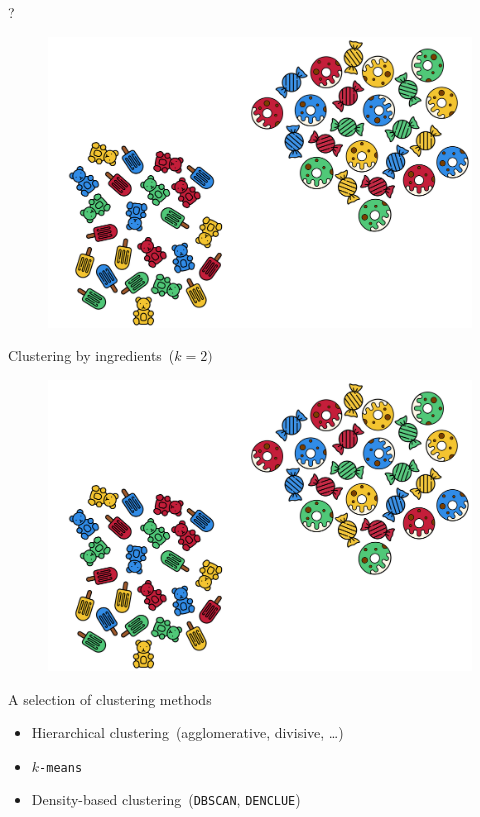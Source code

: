 \documentclass[aspectratio=169]{beamer}
\begin{document}
  \begin{frame}{?}
    \begin{figure}
      \includegraphics[width=0.75\linewidth]{Figures/Clustering_by_ingredients}
    \end{figure}
  \end{frame}

  \begin{frame}{Clustering by ingredients~($k = 2)$}
    \begin{figure}
      \includegraphics[width=0.75\linewidth]{Figures/Clustering_by_ingredients}
    \end{figure}
  \end{frame}

  \begin{frame}{A selection of clustering methods}
    \begin{itemize}
      \item Hierarchical clustering~(agglomerative, divisive, \dots)
      \item \texttt{$k$-means}
      \item Density-based clustering~(\texttt{DBSCAN}, \texttt{DENCLUE})
    \end{itemize}
  \end{frame}
\end{document}
